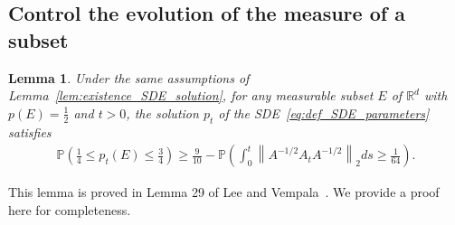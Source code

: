 \documentclass[11pt,twoside]{article}
\newcommand{\co}{A}
\theoremstyle{named}
\theoremstyle{plain}
\newtheorem{lemma}{Lemma}
\newcommand{\vecnorm}[2]{\left\| #1\right\|_{#2}}
\newcommand{\Prob}{\ensuremath{{\mathbb{P}}}}
\newcommand{\usedim}{\ensuremath{d}}
\newcommand{\dims}{\usedim}
\newcommand{\real}{\ensuremath{\mathbb{R}}}
\newcommand{\parenth}[1]{\left( #1 \right)}
\begin{document}

\subsection{Control the evolution of the measure of a subset} %
\label{sub:control_the_evolution_of_the_measure_of_a_subset}

\begin{lemma}
  \label{lem:g_control}
  Under the same assumptions of Lemma~\ref{lem:existence_SDE_solution}, for any measurable subset $E$ of $\real^\dims$ with $p(E) = \frac{1}{2}$ and $t > 0$, the solution $p_t$ of the SDE~\eqref{eq:def_SDE_parameters} satisfies
  \begin{align*}
    \Prob\parenth{\frac{1}{4} \leq p_t(E) \leq \frac{3}{4}} \geq \frac{9}{10} - \Prob\parenth{\int_0^t \vecnorm{\co^{-1/2} A_t \co^{-1/2}}{2} ds \geq \frac{1}{64}}.
  \end{align*}
\end{lemma}
This lemma is proved in Lemma 29 of Lee and Vempala~\cite{lee2016eldan}. We provide a proof here for completeness.
\end{document}
